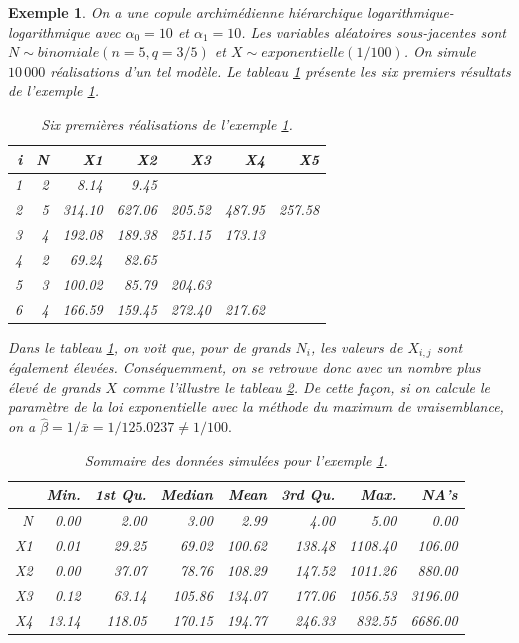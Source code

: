 \documentclass[11pt]{article}
\newtheorem{exemple}{Exemple}
\begin{document}
 		\begin{exemple}\label{exemple_1}
 			On a une copule archimédienne hiérarchique logarithmique-logarithmique avec $\alpha_0 = 10$ et $\alpha_1 = 10$. Les variables aléatoires sous-jacentes sont $N \sim binomiale(n=5, q=3/5)$ et $X \sim exponentielle(1/100)$. On simule $10\,000$ réalisations d'un tel modèle. Le tableau \ref{tbl_head_exemple1} présente les six premiers résultats de l'exemple \ref{exemple_1}.
 			
 			\begin{table}[H]
 				\centering
 				\begin{tabular}{rrrrrrr}
 					\hline
 					i & N & X1 & X2 & X3 & X4 & X5 \\ 
 					\hline
 					1 & 2 & 8.14 & 9.45 &  &  &  \\ 
 					2 & 5 & 314.10 & 627.06 & 205.52 & 487.95 & 257.58 \\ 
 					3 & 4 & 192.08 & 189.38 & 251.15 & 173.13 &  \\ 
 					4 & 2 & 69.24 & 82.65 &  &  &  \\ 
 					5 & 3 & 100.02 & 85.79 & 204.63 &  &  \\ 
 					6 & 4 & 166.59 & 159.45 & 272.40 & 217.62 &  \\ 
 					\hline
 				\end{tabular}
 			\caption{Six premières réalisations de l'exemple \ref{exemple_1}.}
 			\label{tbl_head_exemple1}
 			\end{table}
 		
 			Dans le tableau \ref{tbl_head_exemple1}, on voit que, pour de grands $N_i$, les valeurs de $X_{i,j}$ sont également élevées. Conséquemment, on se retrouve donc avec un nombre plus élevé de grands $X$ comme l'illustre le tableau \ref{tbl_sommaire_exemple_1}. De cette façon, si on calcule le paramètre de la loi exponentielle avec la méthode du maximum de vraisemblance, on a $\hat{\beta} = 1 / \bar{x} = 1 / 125.0237 \neq 1/100.$
 			
 			\begin{table}[H]
 				\centering
 				\begin{tabular}{rrrrrrrr}
 					\hline
 					& Min. & 1st Qu. & Median & Mean & 3rd Qu. & Max. & NA's \\ 
 					\hline
 					N & 0.00 & 2.00 & 3.00 & 2.99 & 4.00 & 5.00 & 0.00 \\ 
 					X1 & 0.01 & 29.25 & 69.02 & 100.62 & 138.48 & 1108.40 & 106.00 \\ 
 					X2 & 0.00 & 37.07 & 78.76 & 108.29 & 147.52 & 1011.26 & 880.00 \\ 
 					X3 & 0.12 & 63.14 & 105.86 & 134.07 & 177.06 & 1056.53 & 3196.00 \\ 
 					X4 & 13.14 & 118.05 & 170.15 & 194.77 & 246.33 & 832.55 & 6686.00 \\ 
 					\hline
 				\end{tabular}
 			\caption{Sommaire des données simulées pour l'exemple \ref{exemple_1}.}
 			\label{tbl_sommaire_exemple_1}
 			\end{table}
 		
 		\end{exemple}
 	
\end{document}
